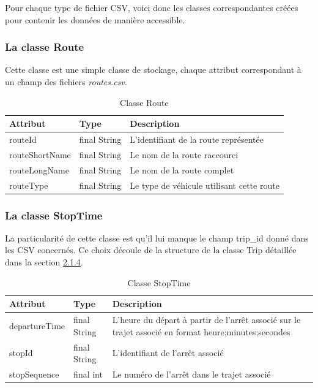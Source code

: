 \documentclass[12pt]{article}
\begin{document}
Pour chaque type de fichier CSV, voici donc les classes correspondantes créées pour contenir les données de manière accessible.

\subsubsection{La classe Route}
Cette classe est une simple classe de stockage, chaque attribut correspondant à un champ des fichiers \emph{routes.csv}.

\begin{table}[h]
    \centering
    \begin{tabular}{|l|l|p{8cm}|}
    \hline
    \textbf{Attribut} & \textbf{Type} & \textbf{Description} \\
    \hline
    routeId & final String & L'identifiant de la route représentée \\
    routeShortName & final String & Le nom de la route raccourci \\
    routeLongName & final String & Le nom de la route complet \\
    routeType & final String & Le type de véhicule utilisant cette route \\
    \hline
    \end{tabular}
    \caption{Classe Route}
\end{table}

\subsubsection{La classe StopTime}
La particularité de cette classe est qu'il lui manque le champ trip\_id donné dans les CSV concernés. Ce choix découle
de la structure de la classe Trip détaillée dans la section \hyperref[sec:trip]{2.1.4}.
\begin{table}[h]
    \centering
    \begin{tabular}{|l|l|p{8cm}|}
    \hline
    \textbf{Attribut} & \textbf{Type} & \textbf{Description} \\
    \hline
    departureTime & final String & L'heure du départ à partir de
                                   l'arrêt associé sur le trajet associé en format 
                                   heure;minutes;secondes \\
    stopId & final String & L'identifiant de l'arrêt associé \\
    stopSequence & final int & Le numéro de l'arrêt dans le trajet associé \\
    \hline
    \end{tabular}
    \caption{Classe StopTime}
\end{table}
\end{document}
